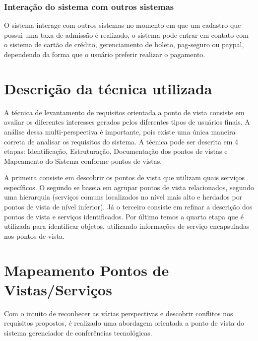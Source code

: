 \documentclass[letter]{article}
\begin{document}
\subsubsection{Interação do sistema com outros sistemas}

O sistema interage com outros sistemas no momento em que um cadastro que possui uma taxa de admissão é realizado, o sistema pode entrar em contato com o sistema de cartão de crédito, gerenciamento de boleto, pag-seguro ou paypal, dependendo da forma que o usuário preferir realizar o pagamento.



\section{Descrição da técnica utilizada}

A técnica de levantamento de requisitos orientada a ponto de vista consiste em avaliar os diferentes interesses gerados pelos diferentes tipos de usuários finais. A análise dessa multi-perspectiva é importante, pois existe uma única maneira correta de analisar os requisitos do sistema. A técnica pode ser descrita em 4 etapas: Identificação, Estruturação, Documentação dos pontos de vistas e Mapeamento do Sistema conforme pontos de vistas.

A primeira consiste em descobrir os pontos de vista que utilizam quais serviços específicos. O segundo se baseia em agrupar pontos de vista relacionados, segundo uma hierarquia (serviços comuns localizados no nível mais alto e herdados por pontos de vista de nível inferior). Já o terceiro consiste em refinar a descrição dos pontos de vista e serviços identificados. Por último temos a quarta etapa que é utilizada para identificar objetos, utilizando informações de serviço encapsuladas nos pontos de vista.





\section{Mapeamento Pontos de Vistas/Serviços}

Com o intuito de reconhecer as várias perspectivas e descobrir conflitos nos requisitos propostos, é realizado uma abordagem orientada a ponto de vista do sistema gerenciador de conferências tecnológicas.
\end{document}
